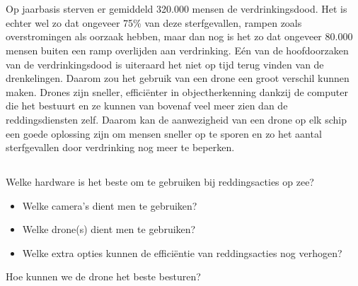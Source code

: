 
\chapter{}
\label{ch:inleiding}

\section{}
\label{sec:probleemstelling}

Op jaarbasis sterven er gemiddeld 320.000 mensen de verdrinkingsdood. Het is echter wel zo dat ongeveer 75\% van deze sterfgevallen, rampen zoals overstromingen als oorzaak hebben, maar dan nog is het zo dat ongeveer 80.000 mensen buiten een ramp overlijden aan verdrinking. \autocite{WorldHealthOrganisation} Eén van de hoofdoorzaken van de verdrinkingsdood is uiteraard het niet op tijd terug vinden van de drenkelingen. Daarom zou het gebruik van een drone een groot verschil kunnen maken. Drones zijn sneller, efficiënter in objectherkenning dankzij de computer die het bestuurt en ze kunnen van bovenaf veel meer zien dan de reddingsdiensten zelf. Daarom kan de aanwezigheid van een drone op elk schip een goede oplossing zijn om mensen sneller op te sporen en zo het aantal sterfgevallen door verdrinking nog meer te beperken.

\newpage

\section{}
\label{sec:onderzoeksvraag}

Welke hardware is het beste om te gebruiken bij reddingsacties op zee?

\begin{itemize}
	\item Welke camera's dient men te gebruiken?
	\item Welke drone(s) dient men te gebruiken?
	\item Welke extra opties kunnen de efficiëntie van reddingsacties nog verhogen?
\end{itemize}

Hoe kunnen we de drone het beste besturen?

